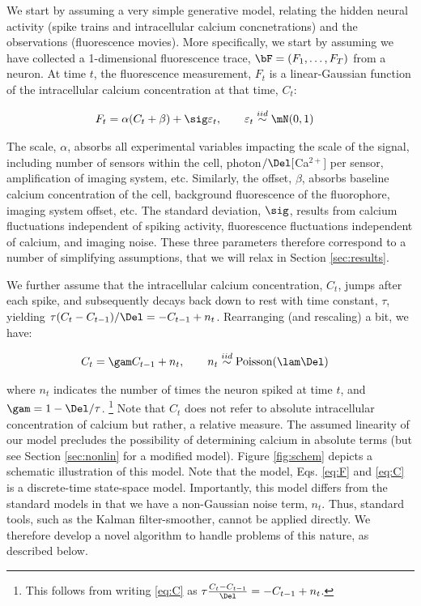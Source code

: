 We start by assuming a very simple generative model, relating the hidden neural activity (spike trains and intracellular calcium concnetrations) and the observations (fluorescence movies).  More specifically, we start by assuming we have collected a 1-dimensional fluorescence trace, $\bF=(F_1, \ldots, F_T)$ from a neuron.  At time $t$, the fluorescence measurement, $F_t$ is a linear-Gaussian function of the intracellular calcium concentration at that time, $C_t$:

\begin{align} \label{eq:F}
F_t &= \alpha (C_t + \beta) + \sig \varepsilon_t, \qquad \varepsilon_t \overset{iid}{\sim} \mN(0,1)
\end{align}

\noindent The scale, $\alpha$, absorbs all experimental variables impacting the scale of the signal, including number of sensors within the cell, photon$/\Del [$Ca$^{2+}]$ per sensor, amplification of imaging system, etc.  Similarly, the offset, $\beta$, absorbs baseline calcium concentration of the cell, background fluorescence of the fluorophore, imaging system offset, etc.  The standard deviation, $\sig$, results from calcium fluctuations independent of spiking activity, fluorescence fluctuations independent of calcium, and imaging noise. These three parameters therefore correspond to a number of simplifying assumptions, that we will relax in Section \ref{sec:results}.  

We further assume that the intracellular calcium concentration, $C_t$, jumps after each spike, and subsequently decays back down to rest with time constant, $\tau$, yielding $\tau (C_t-C_{t-1})/\Del = -C_{t-1} + n_t$.  Rearranging (and rescaling) a bit, we have:

\begin{align} \label{eq:C}
	C_t  &= \gam C_{t-1} + n_t, \qquad n_t \overset{iid}{\sim} \text{Poisson}(\lam \Del)
\end{align}

\noindent where $n_t$ indicates the number of times the neuron spiked at time $t$, and $\gam=1-\Del/\tau$. \footnote{This follows from writing \eqref{eq:C} as $\tau \frac{C_t - C_{t-1}}{\Del} = -C_{t-1} + n_t$.} Note that $C_t$ does not refer to absolute intracellular concentration of calcium but rather, a relative measure.  The assumed linearity of our model precludes the possibility of determining calcium in absolute terms (but see Section \ref{sec:nonlin} for a modified model).  Figure \ref{fig:schem} depicts a schematic illustration of this model. Note that the model, Eqs. \eqref{eq:F} and \eqref{eq:C} is a discrete-time state-space model.  Importantly, this model differs from the standard models in that we have a non-Gaussian noise term, $n_t$.  Thus, standard tools, such as the Kalman filter-smoother, cannot be applied directly.  We therefore develop a novel algorithm to handle problems of this nature, as described below.

